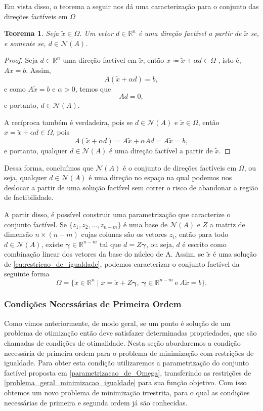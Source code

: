 \documentclass[12pt,a4paper]{scrartcl}
\def\RR{\mathds{R}}
\newtheorem{teo}{Teorema}
\theoremstyle{definition}%
\begin{document}
Em vista disso, o teorema a seguir nos dá uma caracterização para o conjunto das direções factíveis em $\Omega$
\begin{teo} \label{teo:direcao_factivel_igualdade}
Seja $\tilde{x} \in \Omega$. Um vetor $d \in \RR^{n}$ é uma direção factível a partir de $\tilde{x}$ se, e somente se, $d \in \mathcal{N}(A)$.
\end{teo}
\begin{proof}
Seja $d \in \RR^{n}$ uma direção factível em $\tilde{x}$, então $x \coloneqq \tilde{x} + \alpha d \in \Omega$ , isto é, $Ax=b$. Assim, 
\[
A(\tilde{x} + \alpha d) = b,
\] 
e como $A\tilde{x} = b$ e $\alpha >0$, temos que 
\[
Ad = 0,
\] 
e portanto, $d \in \mathcal{N}(A)$.

A recíproca também é verdadeira, pois se $d \in \mathcal{N}(A)$ e $\tilde{x} \in \Omega$, então $x= \tilde{x} + \alpha d \in \Omega$, pois
\[
A(\tilde{x} + \alpha d) = A\tilde{x} + \alpha Ad = A\tilde{x} = b ,
\]
e portanto, qualquer $d \in \mathcal{N}(A)$ é uma direção factível a partir de $\tilde{x}$. 
\end{proof}

Dessa forma, concluímos que $\mathcal{N}(A)$ é o conjunto de direções factíveis em $\Omega$, ou seja, qualquer $d \in \mathcal{N}(A)$ é uma direção no espaço na qual podemos nos deslocar a partir de uma solução factível sem correr o risco de abandonar a região de factibilidade.

A partir disso, é possível construir uma parametrização que caracterize o conjunto factível. Se $\{ z_{1}, z_{2}, \ldots , z_{n-m} \}$ é uma base de $\mathcal{N}(A)$ e $Z$ a matriz de dimensão $n\times (n-m)$ cujas colunas são os vetores $z_{i}$, então para todo $d \in \mathcal{N}(A)$, existe $\boldsymbol{\gamma} \in \RR^{n-m}$ tal que $d=Z\boldsymbol{\gamma}$, ou seja, $d$ é escrito como combinação linear dos vetores da base do núcleo de A. Assim, se $\tilde{x}$ é uma solução de \eqref{eq:restricao_de_igualdade}, podemos caracterizar o conjunto factível da seguinte forma
\[ \label{parametrizacao_de_Omega}
\Omega = \{ x \in \RR^{n} \mid x=\tilde{x} + Z\boldsymbol{\gamma} , \ \boldsymbol{\gamma} \in \RR^{n-m} \ \text{e} \ A\tilde{x} =b \} .
\]

\subsubsection{Condições Necessárias de Primeira Ordem} \label{subsection:condicoes_1ordem_igualdade}

Como vimos anteriormente, de modo geral, se um ponto é solução de um problema de otimização então deve satisfazer determinadas propriedades, que são chamadas de condições de otimalidade. Nesta seção abordaremos a condição necessária de primeira ordem para o problema de minimização com restrições de igualdade. Para obter esta condição utilizaremos a parametrização do conjunto factível proposta em \eqref{parametrizacao_de_Omega}, transferindo as restrições de \eqref{problema_geral_minimizacao_igualdade} para sua função objetivo. Com isso obtemos um novo problema de minimização irrestrita, para o qual as condições necessárias de primeira e segunda ordem já são conhecidas.
\end{document}
